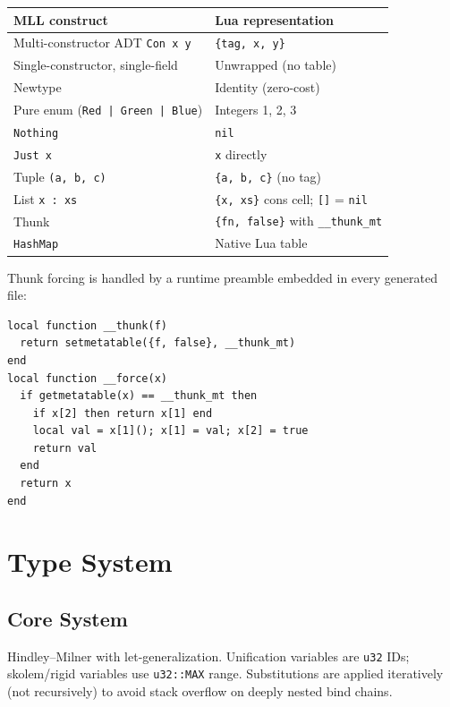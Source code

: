 \documentclass[11pt,a4paper]{article}
\begin{document}
\begin{tabular}{@{}ll@{}}
\toprule
\textbf{MLL construct} & \textbf{Lua representation} \\
\midrule
Multi-constructor ADT \texttt{Con x y}  & \texttt{\{tag, x, y\}} \\
Single-constructor, single-field        & Unwrapped (no table) \\
Newtype                                 & Identity (zero-cost) \\
Pure enum (\texttt{Red | Green | Blue}) & Integers 1, 2, 3 \\
\texttt{Nothing}                        & \texttt{nil} \\
\texttt{Just x}                         & \texttt{x} directly \\
Tuple \texttt{(a, b, c)}                & \texttt{\{a, b, c\}} (no tag) \\
List \texttt{x : xs}                    & \texttt{\{x, xs\}} cons cell; \texttt{[]} = \texttt{nil} \\
Thunk                                   & \texttt{\{fn, false\}} with \texttt{\_\_thunk\_mt} \\
\texttt{HashMap}                        & Native Lua table \\
\bottomrule
\end{tabular}

\medskip

Thunk forcing is handled by a runtime preamble embedded in every generated file:
\begin{lstlisting}[language={}]
local function __thunk(f)
  return setmetatable({f, false}, __thunk_mt)
end
local function __force(x)
  if getmetatable(x) == __thunk_mt then
    if x[2] then return x[1] end
    local val = x[1](); x[1] = val; x[2] = true
    return val
  end
  return x
end
\end{lstlisting}

\section{Type System}

\subsection{Core System}

Hindley--Milner with let-generalization.  Unification variables are \texttt{u32}
IDs; skolem/rigid variables use \texttt{u32::MAX} range.  Substitutions are
applied iteratively (not recursively) to avoid stack overflow on deeply nested
bind chains.
\end{document}
